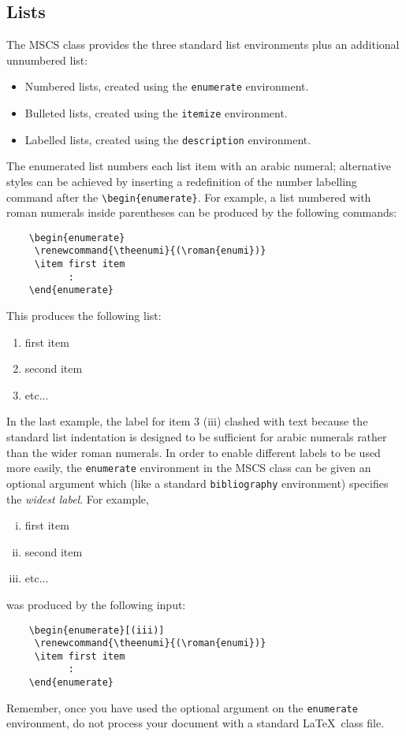 \documentclass{mscs}
\begin{document}
\subsection{Lists}

The MSCS class provides the three standard list environments plus an
additional unnumbered list:
\begin{itemize}
  \item Numbered lists, created using the \verb"enumerate" environment.
  \item Bulleted lists, created using the \verb"itemize" environment.
  \item Labelled lists, created using the \verb"description" environment.
\end{itemize}
The enumerated list numbers each list item with an arabic numeral;
alternative styles can be achieved by inserting a redefinition of the
number labelling command after the \verb"\begin{enumerate}".
For example, a list numbered with roman numerals inside parentheses can be
produced by the following commands:
\begin{verbatim}
    \begin{enumerate}
     \renewcommand{\theenumi}{(\roman{enumi})}
     \item first item
           :
    \end{enumerate}
\end{verbatim}
This produces the following list:
\begin{enumerate}
  \renewcommand{\theenumi}{(\roman{enumi})}
  \item first item
  \item second item
  \item etc...
\end{enumerate}
In the last example, the label for item 3 (iii) clashed with text
because the standard list indentation is designed to be sufficient for
arabic numerals rather than the wider roman numerals.
In order to enable different labels to be used more easily, the
\verb"enumerate" environment in the MSCS class can be given an optional
argument which (like a standard \verb"bibliography" environment)
specifies the \emph{widest label}.
For example,
\begin{enumerate}[(iii)]
\renewcommand{\theenumi}{(\roman{enumi})}
  \item first item
  \item second item
  \item etc...
\end{enumerate}
was produced by the following input:
\begin{verbatim}
    \begin{enumerate}[(iii)]
     \renewcommand{\theenumi}{(\roman{enumi})}
     \item first item
           :
    \end{enumerate}
\end{verbatim}
Remember, once you have used the optional argument on the \verb"enumerate"
environment, do not process your document with a standard \LaTeX\ class
file.
\end{document}
